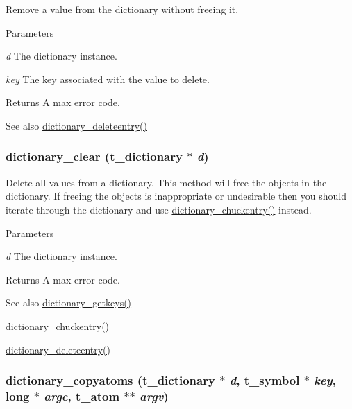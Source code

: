 Remove a value from the dictionary without freeing it. 
\begin{DoxyParams}{Parameters}
\item[{\em d}]The dictionary instance. \item[{\em key}]The key associated with the value to delete. \end{DoxyParams}
\begin{DoxyReturn}{Returns}
A max error code.
\end{DoxyReturn}
\begin{DoxySeeAlso}{See also}
\hyperlink{group__dictionary_gadc367d6d95aa0144c902d05d165f7412}{dictionary\_\-deleteentry()} 
\end{DoxySeeAlso}
\hypertarget{group__dictionary_gafd9a85c38f7e6b1cd075664a5aa4cbc8}{
\subsubsection[{dictionary\_\-clear}]{ dictionary\_\-clear ({\bf t\_\-dictionary} $\ast$ {\em d})}}
\label{group__dictionary_gafd9a85c38f7e6b1cd075664a5aa4cbc8}


Delete all values from a dictionary. This method will free the objects in the dictionary. If freeing the objects is inappropriate or undesirable then you should iterate through the dictionary and use \hyperlink{group__dictionary_gadac447ba3430cc2b8083d62df41932b8}{dictionary\_\-chuckentry()} instead.


\begin{DoxyParams}{Parameters}
\item[{\em d}]The dictionary instance. \end{DoxyParams}
\begin{DoxyReturn}{Returns}
A max error code.
\end{DoxyReturn}
\begin{DoxySeeAlso}{See also}
\hyperlink{group__dictionary_gae595d2340304018ee2b01e1288534ea3}{dictionary\_\-getkeys()} 

\hyperlink{group__dictionary_gadac447ba3430cc2b8083d62df41932b8}{dictionary\_\-chuckentry()} 

\hyperlink{group__dictionary_gadc367d6d95aa0144c902d05d165f7412}{dictionary\_\-deleteentry()} 
\end{DoxySeeAlso}
\hypertarget{group__dictionary_ga15aff654a0d97b363e7676ff7e9709fd}{
\subsubsection[{dictionary\_\-copyatoms}]{ dictionary\_\-copyatoms ({\bf t\_\-dictionary} $\ast$ {\em d}, \/  {\bf t\_\-symbol} $\ast$ {\em key}, \/  long $\ast$ {\em argc}, \/  {\bf t\_\-atom} $\ast$$\ast$ {\em argv})}}
\label{group__dictionary_ga15aff654a0d97b363e7676ff7e9709fd}


